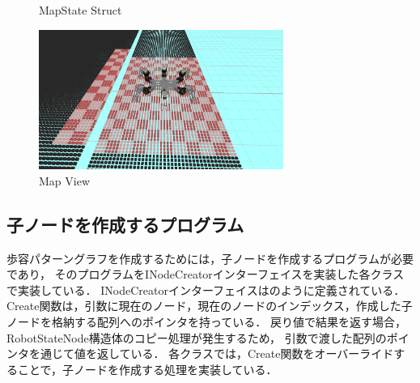 \begin{figure}[h]
  \centering
  \caption{MapState Struct}
  \label{fig:map_class_diagram}  %
\end{figure}

\begin{figure}[h]
  \begin{center}
    \includegraphics[width=80mm, clip]{figure/chapter3/map_view.png}
    \caption{Map View}
    \label{fig:map_view}  %
  \end{center}
\end{figure}


\subsection{子ノードを作成するプログラム}
歩容パターングラフを作成するためには，子ノードを作成するプログラムが必要であり，
そのプログラムをINodeCreatorインターフェイスを実装した各クラスで実装している．
INodeCreatorインターフェイスはのように定義されている．
Create関数は，引数に現在のノード，現在のノードのインデックス，作成した子ノードを格納する配列へのポインタを持っている．
戻り値で結果を返す場合，RobotStateNode構造体のコピー処理が発生するため，
引数で渡した配列のポインタを通じて値を返している．
各クラスでは，Create関数をオーバーライドすることで，子ノードを作成する処理を実装している．

